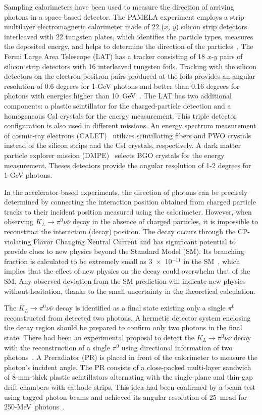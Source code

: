 \documentclass[12pt,times,draftclsnofoot,a4paper]{elsarticle}
\begin{document}
Sampling calorimeters have been used to measure the direction of arriving photons in a space-based detector. The PAMELA experiment employs a strip multilayer electromagnetic calorimeter made of 22 ($x$, $y$) silicon strip detectors interleaved with 22 tungsten plates, which identifies the particle types, measures the deposited energy, and helps to determine the direction of the particles~\cite{PAMELA}. The Fermi Large Area Telescope (LAT) has a tracker consisting of 18 $x$-$y$ pairs of silicon strip detectors with 16 interleaved tungsten foils. Tracking with the silicon detectors on the electron-positron pairs produced at the foils provides an angular resolution of 0.6 degrees for 1-GeV photons and better than 0.16 degrees for photons with energies higher than 10~GeV~\cite{FERMI:LAT}. The LAT has two additional components: a plastic scintillator for the charged-particle detection and a homogeneous CsI crystals for the energy measurement. This triple detector configuration is also used in different missions. An energy spectrum measurement of cosmic-ray electrons (CALET)~\cite{CALET} utilizes scintillating fibers and PWO crystals instead of the silicon strips and the CsI crystals, respectively. A dark matter particle explorer mission (DMPE)~\cite{DMPE} selects BGO crystals for the energy measurement. Theses detectors provide the angular resolution of 1-2 degrees for 1-GeV photons.

In the accelerator-based experiments, the direction of photons can be precisely determined by connecting the interaction position obtained from charged particle tracks to their incident position measured using the calorimeter. However, when observing $K_{L} \rightarrow \pi^{0}\nu\bar{\nu}$ decay in the absence of charged particles, it is impossible to reconstruct the interaction (decay) position. The decay occurs through the CP-violating Flavor Changing Neutral Current and has significant potential to provide clues to new physics beyond the Standard Model (SM). Its branching fraction is calculated to be extremely small as 3~$\times$~10$^{-11}$ in the SM~\cite{KOTOtheory}, which implies that the effect of new physics on the decay could overwhelm that of the SM. Any observed deviation from the SM prediction will indicate new physics without hesitation, thanks to the small uncertainty in the theoretical calculation.

The $K_{L} \rightarrow \pi^{0}\nu\bar{\nu}$ decay is identified as a final state existing only a single $\pi^{0}$ reconstructed from detected two photons. A hermetic detector system enclosing the decay region should be prepared to confirm only two photons in the final state. There had been an experimental proposal to detect the $K_{L} \rightarrow \pi^{0}\nu\bar{\nu}$ decay with the reconstruction of a single $\pi^{0}$ using directional information of two photons~\cite{KOPIO}. A Preradiator (PR) is placed in front of the calorimeter to measure the photon's incident angle. The PR consists of a close-packed multi-layer sandwich of 8-mm-thick plastic scintillators alternating with the single-plane and thin-gap drift chambers with cathode strips. This idea had been confirmed by a beam test using tagged photon beams and achieved its angular resolution of 25~mrad for 250-MeV~photons~\cite{KOPIOcdr}.
\end{document}
